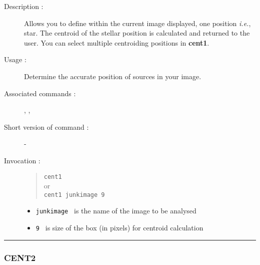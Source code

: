 \begin{description}

\item[Description :] Allows you to define within the current image
displayed, one  position \emph{i.e.}, star.  The centroid of the
stellar position is calculated and returned to the user.  You can
select multiple centroiding positions in {\bf cent1}.

\item[Usage :] Determine the accurate position of sources in your image.
\item[Associated commands :] {\tt {}}, 
{\tt {}}, {\tt {}}
\item[Short version of command :] -
\item[Invocation :]

\begin{quote}{\tt  cent1 }\\
or \\
{\tt cent1 junkimage 9 }
\end{quote}

\begin{itemize}

\item {\tt junkimage } is the name of the image to be analysed
\item {\tt 9 } is size of the box (in pixels) for centroid calculation

\end{itemize}

\end{description}

\hrule 
\subsubsection*{\label{CENT2}CENT2}

